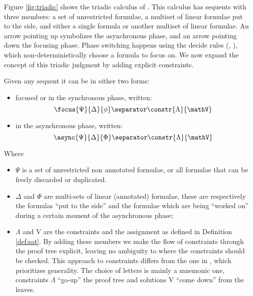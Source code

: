 Figure \ref{fig:triadic} shows the triadic calculus of \cite{Focusing}.
This calculus has sequents with three members: a set of unrestricted formulae, a multiset of linear formulae put to the side, and either a single formula or another multiset of linear formulae.
An arrow pointing up symbolizes the asynchronous phase, and an arrow pointing down the focusing phase.
Phase switching happens using the decide rules (\derRule[A]{\displaydecide[1]}, \derRule[A]{\displaydecide[2]}), which non-deterministically choose a formula to focus on.
We now expand the concept of this triadic judgment by adding explicit constraints.
\begin{define}
	Given any sequent it can be in either two forms:
	\begin{itemize}
		\item focused or in the synchronous phase, written:
			$$\focus{\Psi}{\Delta}{\phi} \separator \constr{\Lambda}{\mathV}$$
		\item in the asynchronous phase, written:
			$$\async{\Psi}{\Delta}{\Phi} \separator \constr{\Lambda}{\mathV}$$
	\end{itemize}
	Where 
	\begin{itemize}
		\item $\Psi$ is a set of unrestricted non annotated formulae, or all formulae that can be freely discarded or duplicated.
		\item $\Delta$ and $\Phi$ are multi-sets of linear (annotated) formulae, these are respectively the formulas ``put to the side'' and the formulae which are being ``worked on'' during a certain moment of the asynchronous phase;
		\item $\Lambda$ and V are the constraints and the assignment as defined in Definition \ref{def:sat}.
			By adding these members we make the flow of constraints through the proof tree explicit, leaving no ambiguity to where the constraints should be checked.
			This approach to constraints differs from the one in \cite{HarlandPym}, which prioritizes generality.
			The choice of letters is mainly a mnemonic one, constraints $\Lambda$ ``go-up'' the proof tree and solutions V ``come down'' from the leaves.
	\end{itemize}
\end{define}

